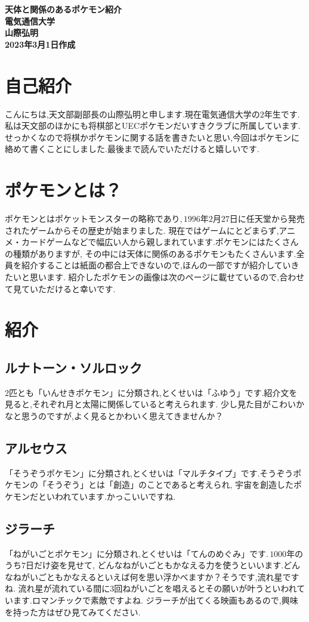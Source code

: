 \documentclass{article}
\begin{document}
\begin{center}
	{\Large{\bf 天体と関係のあるポケモン紹介}} \\
	{\bf 電気通信大学 \\
	山際弘明} \\
	{\bf 2023年3月1日作成}\\
\end{center}
\section{自己紹介}
こんにちは,天文部副部長の山際弘明と申します.現在電気通信大学の$2$年生です.私は天文部のほかにも将棋部とUECポケモンだいすきクラブに所属しています.
せっかくなので将棋かポケモンに関する話を書きたいと思い,今回はポケモンに絡めて書くことにしました.最後まで読んでいただけると嬉しいです.
\section{ポケモンとは？}
ポケモンとはポケットモンスターの略称であり,\,$1996$年$2$月$27$日に任天堂から発売されたゲームからその歴史が始まりました.
現在ではゲームにとどまらず,アニメ・カードゲームなどで幅広い人から親しまれています.ポケモンにはたくさんの種類がありますが,
その中には天体に関係のあるポケモンもたくさんいます.全員を紹介することは紙面の都合上できないので,ほんの一部ですが紹介していきたいと思います.
紹介したポケモンの画像は次のページに載せているので,合わせて見ていただけると幸いです.
\section{紹介}
\subsection{ルナトーン・ソルロック}
$2$匹とも「いんせきポケモン」に分類され,とくせいは「ふゆう」です.紹介文を見ると,それぞれ月と太陽に関係していると考えられます.
少し見た目がこわいかなと思うのですが,よく見るとかわいく思えてきませんか？
\subsection{アルセウス}
「そうぞうポケモン」に分類され,とくせいは「マルチタイプ」です.そうぞうポケモンの「そうぞう」とは「創造」のことであると考えられ,
宇宙を創造したポケモンだといわれています.かっこいいですね.
\subsection{ジラーチ}
「ねがいごとポケモン」に分類され,とくせいは「てんのめぐみ」です.\,$1000$年のうち$7$日だけ姿を見せて,
どんなねがいごともかなえる力を使うといいます.どんなねがいごともかなえるといえば何を思い浮かべますか？そうです,流れ星ですね.
流れ星が流れている間に$3$回ねがいごとを唱えるとその願いが叶うといわれています.ロマンチックで素敵ですよね.
ジラーチが出てくる映画もあるので,興味を持った方はぜひ見てみてください.
\end{document}
